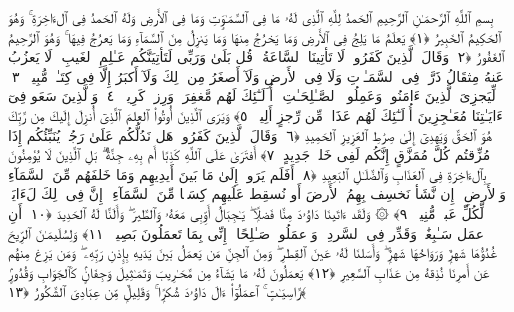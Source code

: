 
  
    
  
    
    

\nopagebreak
  بِسمِ ٱللَّهِ ٱلرَّحمَـٰنِ ٱلرَّحِيمِ
  ٱلحَمدُ لِلَّهِ ٱلَّذِى لَهُۥ مَا فِى ٱلسَّمَـٰوَٟتِ وَمَا فِى ٱلأَرضِ وَلَهُ ٱلحَمدُ فِى ٱلءَاخِرَةِ ۚ وَهُوَ ٱلحَكِيمُ ٱلخَبِيرُ ﴿١﴾
 يَعلَمُ مَا يَلِجُ فِى ٱلأَرضِ وَمَا يَخرُجُ مِنهَا وَمَا يَنزِلُ مِنَ ٱلسَّمَآءِ وَمَا يَعرُجُ فِيهَا ۚ وَهُوَ ٱلرَّحِيمُ ٱلغَفُورُ ﴿٢﴾
 وَقَالَ ٱلَّذِينَ كَفَرُوا۟ لَا تَأتِينَا ٱلسَّاعَةُ ۖ قُل بَلَىٰ وَرَبِّى لَتَأتِيَنَّكُم عَـٰلِمِ ٱلغَيبِ ۖ لَا يَعزُبُ عَنهُ مِثقَالُ ذَرَّةٍۢ فِى ٱلسَّمَـٰوَٟتِ وَلَا فِى ٱلأَرضِ وَلَآ أَصغَرُ مِن ذَٟلِكَ وَلَآ أَكبَرُ إِلَّا فِى كِتَـٰبٍۢ مُّبِينٍۢ ﴿٣﴾
 لِّيَجزِىَ ٱلَّذِينَ ءَامَنُوا۟ وَعَمِلُوا۟ ٱلصَّـٰلِحَـٰتِ ۚ أُو۟لَـٰٓئِكَ لَهُم مَّغفِرَةٌۭ وَرِزقٌۭ كَرِيمٌۭ ﴿٤﴾
 وَٱلَّذِينَ سَعَو فِىٓ ءَايَـٰتِنَا مُعَـٰجِزِينَ أُو۟لَـٰٓئِكَ لَهُم عَذَابٌۭ مِّن رِّجزٍ أَلِيمٌۭ ﴿٥﴾
 وَيَرَى ٱلَّذِينَ أُوتُوا۟ ٱلعِلمَ ٱلَّذِىٓ أُنزِلَ إِلَيكَ مِن رَّبِّكَ هُوَ ٱلحَقَّ وَيَهدِىٓ إِلَىٰ صِرَٰطِ ٱلعَزِيزِ ٱلحَمِيدِ ﴿٦﴾
 وَقَالَ ٱلَّذِينَ كَفَرُوا۟ هَل نَدُلُّكُم عَلَىٰ رَجُلٍۢ يُنَبِّئُكُم إِذَا مُزِّقتُم كُلَّ مُمَزَّقٍ إِنَّكُم لَفِى خَلقٍۢ جَدِيدٍ ﴿٧﴾
 أَفتَرَىٰ عَلَى ٱللَّهِ كَذِبًا أَم بِهِۦ جِنَّةٌۢ ۗ بَلِ ٱلَّذِينَ لَا يُؤمِنُونَ بِٱلءَاخِرَةِ فِى ٱلعَذَابِ وَٱلضَّلَـٰلِ ٱلبَعِيدِ ﴿٨﴾
 أَفَلَم يَرَوا۟ إِلَىٰ مَا بَينَ أَيدِيهِم وَمَا خَلفَهُم مِّنَ ٱلسَّمَآءِ وَٱلأَرضِ ۚ إِن نَّشَأ نَخسِف بِهِمُ ٱلأَرضَ أَو نُسقِط عَلَيهِم كِسَفًۭا مِّنَ ٱلسَّمَآءِ ۚ إِنَّ فِى ذَٟلِكَ لَءَايَةًۭ لِّكُلِّ عَبدٍۢ مُّنِيبٍۢ ﴿٩﴾
 ۞ وَلَقَد ءَاتَينَا دَاوُۥدَ مِنَّا فَضلًۭا ۖ يَـٰجِبَالُ أَوِّبِى مَعَهُۥ وَٱلطَّيرَ ۖ وَأَلَنَّا لَهُ ٱلحَدِيدَ ﴿١٠﴾
 أَنِ ٱعمَل سَـٰبِغَٰتٍۢ وَقَدِّر فِى ٱلسَّردِ ۖ وَٱعمَلُوا۟ صَـٰلِحًا ۖ إِنِّى بِمَا تَعمَلُونَ بَصِيرٌۭ ﴿١١﴾
 وَلِسُلَيمَـٰنَ ٱلرِّيحَ غُدُوُّهَا شَهرٌۭ وَرَوَاحُهَا شَهرٌۭ ۖ وَأَسَلنَا لَهُۥ عَينَ ٱلقِطرِ ۖ وَمِنَ ٱلجِنِّ مَن يَعمَلُ بَينَ يَدَيهِ بِإِذنِ رَبِّهِۦ ۖ وَمَن يَزِغ مِنهُم عَن أَمرِنَا نُذِقهُ مِن عَذَابِ ٱلسَّعِيرِ ﴿١٢﴾
 يَعمَلُونَ لَهُۥ مَا يَشَآءُ مِن مَّحَـٰرِيبَ وَتَمَـٰثِيلَ وَجِفَانٍۢ كَٱلجَوَابِ وَقُدُورٍۢ رَّاسِيَـٰتٍ ۚ ٱعمَلُوٓا۟ ءَالَ دَاوُۥدَ شُكرًۭا ۚ وَقَلِيلٌۭ مِّن عِبَادِىَ ٱلشَّكُورُ ﴿١٣﴾
